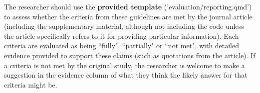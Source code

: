 The researcher should use the \textbf{provided template} ('evaluation/reporting.qmd')\autocite{heather_template_2024} to assess whether the criteria from these guidelines are met by the journal article (including the supplementary material, although not including the code unless the article specifically refers to it for providing particular information). Each criteria are evaluated as being ``fully", ``partially" or ``not met", with detailed evidence provided to support these claims (such as quotations from the article). If a criteria is not met by the original study, the researcher is welcome to make a suggestion in the evidence column of what they think the likely answer for that criteria might be.